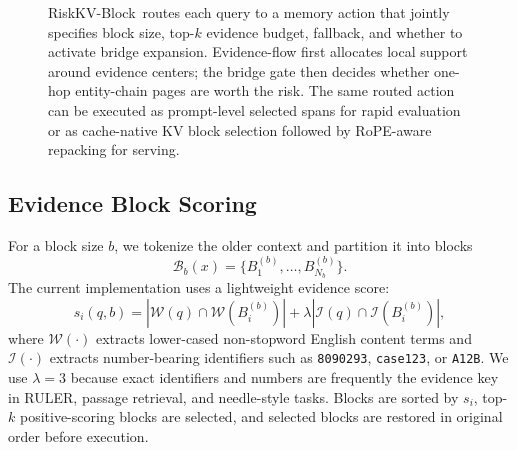 \documentclass{article}
\newcommand{\method}{RiskKV-Block}
\newcommand{\blocks}{\mathcal{B}}
\begin{document}
\begin{figure}[t]
{
}
\caption{\method\ routes each query to a memory action that jointly specifies block size, top-$k$ evidence budget, fallback, and whether to activate bridge expansion. Evidence-flow first allocates local support around evidence centers; the bridge gate then decides whether one-hop entity-chain pages are worth the risk. The same routed action can be executed as prompt-level selected spans for rapid evaluation or as cache-native KV block selection followed by RoPE-aware repacking for serving.}
\label{fig:architecture}
\end{figure}

\subsection{Evidence Block Scoring}

For a block size $b$, we tokenize the older context and partition it into blocks
\begin{equation}
    \blocks_b(x) = \{B_1^{(b)},\ldots,B_{N_b}^{(b)}\}.
\end{equation}
The current implementation uses a lightweight evidence score:
\begin{equation}
    s_i(q,b)
    =
    |\mathcal{W}(q) \cap \mathcal{W}(B_i^{(b)})|
    +
    \lambda
    |\mathcal{I}(q) \cap \mathcal{I}(B_i^{(b)})|,
    \label{eq:block-score}
\end{equation}
where $\mathcal{W}(\cdot)$ extracts lower-cased non-stopword English content terms and $\mathcal{I}(\cdot)$ extracts number-bearing identifiers such as \texttt{8090293}, \texttt{case123}, or \texttt{A12B}.
We use $\lambda=3$ because exact identifiers and numbers are frequently the evidence key in RULER, passage retrieval, and needle-style tasks.
Blocks are sorted by $s_i$, top-$k$ positive-scoring blocks are selected, and selected blocks are restored in original order before execution.
\end{document}
